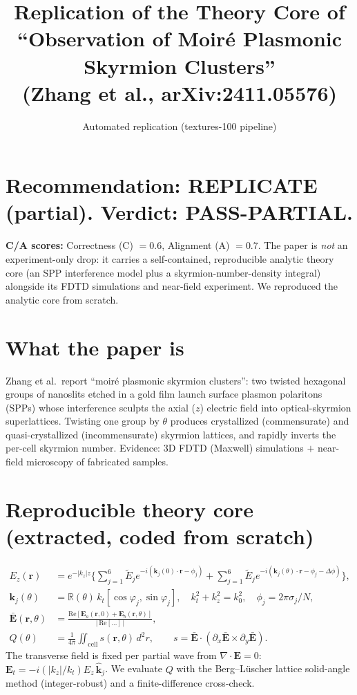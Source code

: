 \documentclass[11pt]{article}
\title{Replication of the Theory Core of\\ ``Observation of Moir\'e Plasmonic Skyrmion Clusters''\\ (Zhang et al., arXiv:2411.05576)}
\author{Automated replication (textures-100 pipeline)}
\date{}
\begin{document}
\maketitle

\section*{Recommendation: REPLICATE (partial). Verdict: PASS-PARTIAL.}
\textbf{C/A scores:} Correctness (C) $=0.6$, Alignment (A) $=0.7$.
The paper is \emph{not} an experiment-only drop: it carries a self-contained,
reproducible analytic theory core (an SPP interference model plus a
skyrmion-number-density integral) alongside its FDTD simulations and near-field
experiment. We reproduced the analytic core from scratch.

\section{What the paper is}
Zhang et al.\ report ``moir\'e plasmonic skyrmion clusters'': two twisted
hexagonal groups of nanoslits etched in a gold film launch surface plasmon
polaritons (SPPs) whose interference sculpts the axial ($z$) electric field into
optical-skyrmion superlattices. Twisting one group by $\theta$ produces
crystallized (commensurate) and quasi-crystallized (incommensurate) skyrmion
lattices, and rapidly inverts the per-cell skyrmion number. Evidence: 3D FDTD
(Maxwell) simulations $+$ near-field microscopy of fabricated samples.

\section{Reproducible theory core (extracted, coded from scratch)}
\begin{align}
E_z(\mathbf r) &= e^{-|k_z|z}\Big\{\textstyle\sum_{j=1}^{6}\tilde E_j
   e^{-i(\mathbf k_j(0)\cdot\mathbf r-\phi_j)}
 + \sum_{j=1}^{6}\tilde E_j e^{-i(\mathbf k_j(\theta)\cdot\mathbf r-\phi_j-\Delta\phi)}\Big\}, \tag{1}\\
\mathbf k_j(\theta) &= \mathbb{R}(\theta)\,k_t[\cos\varphi_j,\sin\varphi_j],\quad
   k_t^2+k_z^2=k_0^2,\quad \phi_j=2\pi\sigma_j/N,\\
\bar{\mathbf E}(\mathbf r,\theta) &=
   \frac{\mathrm{Re}[\mathbf E_a(\mathbf r,0)+\mathbf E_b(\mathbf r,\theta)]}
        {|\,\mathrm{Re}[\dots]\,|}, \tag{2}\\
Q(\theta) &= \frac{1}{4\pi}\iint_{\mathrm{cell}} s(\mathbf r,\theta)\,d^2r, \qquad
s = \bar{\mathbf E}\cdot(\partial_x\bar{\mathbf E}\times\partial_y\bar{\mathbf E}). \tag{3,4}
\end{align}
The transverse field is fixed per partial wave from $\nabla\cdot\mathbf E=0$:
$\mathbf E_t=-i(|k_z|/k_t)E_z\,\hat{\mathbf k}_j$. We evaluate $Q$ with the
Berg--L\"uscher lattice solid-angle method (integer-robust) and a
finite-difference cross-check.
\end{document}
